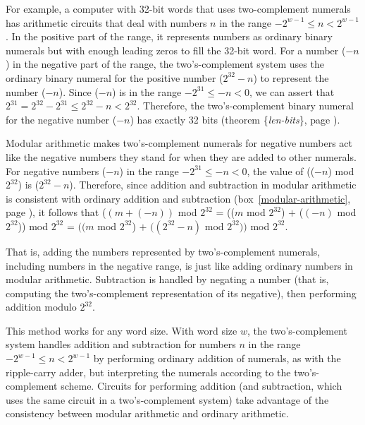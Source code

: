 For example, a computer with
32-bit words that uses
two-complement numerals has arithmetic circuits that
deal with numbers $n$ in the range $-2^{w-1} \leq n < 2^{w-1}$.
In the positive part of the range, it represents numbers as
ordinary binary numerals but with enough leading zeros
to fill the 32-bit word.
For a number ($-n$) in the negative part of the range,
the two's-complement system uses the ordinary binary numeral
for the positive number ($2^{32}-n$) to represent the number ($-n$).
Since ($-n$) is in the range
$-2^{31} \leq -n < 0$, we can assert that
$2^{31} = 2^{32}-2^{31} \leq 2^{32}-n < 2^{32}$.
Therefore, the two's-complement binary numeral
for the negative number ($-n$)
has exactly 32 bits (theorem \{\emph{len-bits}\}, page \pageref{len-bits}).

Modular arithmetic makes two's-complement
numerals
for negative numbers act like the negative numbers they stand for
when they are added to other numerals.
For negative numbers ($-n$) in the range $-2^{31} \leq -n < 0$,
the value of (($-n$) mod $2^{32}$) is ($2^{32}-n$).
Therefore, since addition and subtraction
in modular arithmetic is consistent with ordinary addition and subtraction
(box~\ref{modular-arithmetic}, page \pageref{modular-arithmetic}), it follows that
  ($(m+(-n))$ mod $2^{32}$
= (($m$ mod $2^{32}$) $+$ ($(-n)$ mod $2^{32}$)) mod $2^{32}$
= $((m$ mod $2^{32}$) $+$ $((2^{32} - n)$ mod $2^{32}))$ mod $2^{32}$.

That is, adding the numbers represented by two's-complement
numerals, including numbers in the negative range,
is just like adding ordinary numbers in modular arithmetic.
Subtraction is handled by negating a number
(that is, computing the two's-complement representation
of its negative), then performing addition modulo $2^{32}$.

This method works for any word size.
With word size $w$, the two's-complement system
handles addition and subtraction for numbers $n$
in the range $-2^{w-1} \leq n < 2^{w-1}$
by performing ordinary addition of numerals,
as with the ripple-carry adder, but interpreting
the numerals according to the two's-complement scheme.
Circuits for performing addition (and subtraction, which
uses the same circuit in a two's-complement system)
take advantage of the consistency between modular arithmetic
and ordinary arithmetic.

